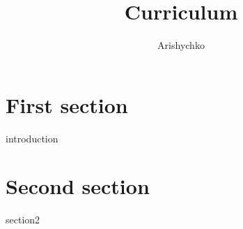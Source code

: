 \documentclass{article}
\title{Curriculum}
\author{Arishychko}
\begin{document}
\maketitle

\section{First section}
{introduction}

\section{Second section}
{section2}
\end{document}
